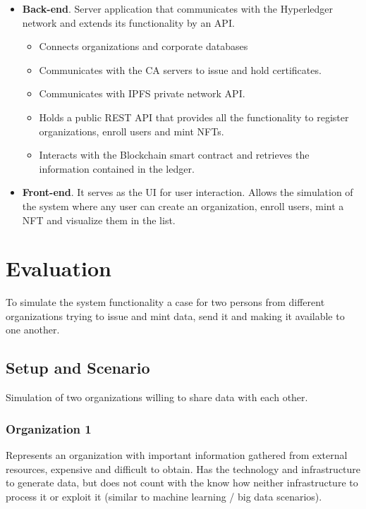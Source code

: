 \documentclass[a4paper]{article}
\begin{document}
\begin{itemize}
\begin{itemize}
    \end{itemize}
    \item \textbf{Back-end}. Server application that communicates with the Hyperledger network and extends its functionality by an API. 
    \begin{itemize}
        \item Connects organizations and corporate databases
        \item Communicates with the CA servers to issue and hold certificates.
        \item Communicates with IPFS private network API. 
        \item Holds a public REST API that provides all the functionality to register organizations, enroll users and mint NFTs.
        \item Interacts with the Blockchain smart contract and retrieves the information contained in the ledger. 
    \end{itemize}
    \item \textbf{Front-end}. It serves as the UI for user interaction. Allows the simulation of the system where any user can create an organization, enroll users, mint a NFT and visualize them in the list.
\end{itemize}



\section{Evaluation}

To simulate the system functionality a case for two persons from different organizations trying to issue and mint data, send it and making it available to one another.

\subsection{Setup and Scenario}
Simulation of two organizations willing to share data with each other.
\subsubsection{Organization 1}
Represents an organization with important information gathered from external resources, expensive and difficult to obtain. Has the technology and infrastructure to generate data, but does not count with the know how neither infrastructure to process it or exploit it (similar to machine learning / big data scenarios).
\end{document}
